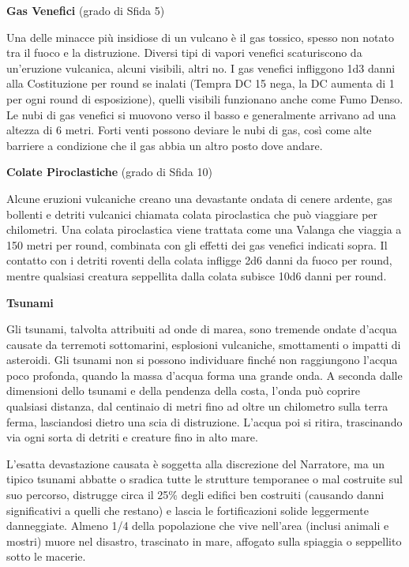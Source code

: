 \documentclass[a4paper,twoside,openany]{book}
\begin{document}
\begin{multicols}{2}
\textbf{Gas Venefici} (grado di Sfida 5)

Una delle minacce più insidiose di un vulcano è il gas tossico, spesso non notato tra il fuoco e la distruzione. Diversi tipi di vapori venefici scaturiscono da un'eruzione vulcanica, alcuni visibili, altri no. I gas venefici infliggono 1d3 danni alla Costituzione per round se inalati (Tempra DC 15 nega, la DC aumenta di 1 per ogni round di esposizione), quelli visibili funzionano anche come Fumo Denso. Le nubi di gas venefici si muovono verso il basso e generalmente arrivano ad una altezza di 6 metri. Forti venti possono deviare le nubi di gas, così come alte barriere a condizione che il gas abbia un altro posto dove andare.

\textbf{Colate Piroclastiche} (grado di Sfida 10)

Alcune eruzioni vulcaniche creano una devastante ondata di cenere ardente, gas bollenti e detriti vulcanici chiamata colata piroclastica che può viaggiare per chilometri. Una colata piroclastica viene trattata come una Valanga che viaggia a 150 metri per round, combinata con gli effetti dei gas venefici indicati sopra. Il contatto con i detriti roventi della colata infligge 2d6 danni da fuoco per round, mentre qualsiasi creatura seppellita dalla colata subisce 10d6 danni per round.

\textbf{Tsunami}

Gli tsunami, talvolta attribuiti ad onde di marea, sono tremende ondate d'acqua causate da terremoti sottomarini, esplosioni vulcaniche, smottamenti o impatti di asteroidi. Gli tsunami non si possono individuare finché non raggiungono l'acqua poco profonda, quando la massa d'acqua forma una grande onda. A seconda dalle dimensioni dello tsunami e della pendenza della costa, l'onda può coprire qualsiasi distanza, dal centinaio di metri fino ad oltre un chilometro sulla terra ferma, lasciandosi dietro una scia di distruzione. L'acqua poi si ritira, trascinando via ogni sorta di detriti e creature fino in alto mare.

L'esatta devastazione causata è soggetta alla discrezione del Narratore, ma un tipico tsunami abbatte o sradica tutte le strutture temporanee o mal costruite sul suo percorso, distrugge circa il 25\% degli edifici ben costruiti (causando danni significativi a quelli che restano) e lascia le fortificazioni solide leggermente danneggiate. Almeno 1/4 della popolazione che vive nell'area (inclusi animali e mostri) muore nel disastro, trascinato in mare, affogato sulla spiaggia o seppellito sotto le macerie.


\end{multicols}
\end{document}
